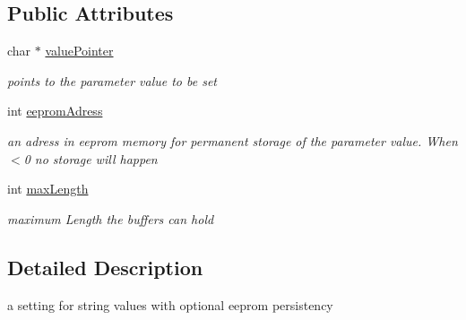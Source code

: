 \subsection*{Public Attributes}
\begin{DoxyCompactItemize}
\item 
\hypertarget{class_string_parameter_setting_a9bb351a9ba7b80dc6eef47c0f54fb98c}{char $\ast$ \hyperlink{class_string_parameter_setting_a9bb351a9ba7b80dc6eef47c0f54fb98c}{value\-Pointer}}\label{class_string_parameter_setting_a9bb351a9ba7b80dc6eef47c0f54fb98c}

\begin{DoxyCompactList}\small\item\em points to the parameter value to be set \end{DoxyCompactList}\item 
\hypertarget{class_string_parameter_setting_a4947df623519cd98c5d0ac3194b8c9f1}{int \hyperlink{class_string_parameter_setting_a4947df623519cd98c5d0ac3194b8c9f1}{eeprom\-Adress}}\label{class_string_parameter_setting_a4947df623519cd98c5d0ac3194b8c9f1}

\begin{DoxyCompactList}\small\item\em an adress in eeprom memory for permanent storage of the parameter value. When $<$0 no storage will happen \end{DoxyCompactList}\item 
\hypertarget{class_string_parameter_setting_ae04aa807e2f40b0f607d05c4a780a03c}{int \hyperlink{class_string_parameter_setting_ae04aa807e2f40b0f607d05c4a780a03c}{max\-Length}}\label{class_string_parameter_setting_ae04aa807e2f40b0f607d05c4a780a03c}

\begin{DoxyCompactList}\small\item\em maximum Length the buffers can hold \end{DoxyCompactList}\end{DoxyCompactItemize}


\subsection{Detailed Description}
a setting for string values with optional eeprom persistency 

